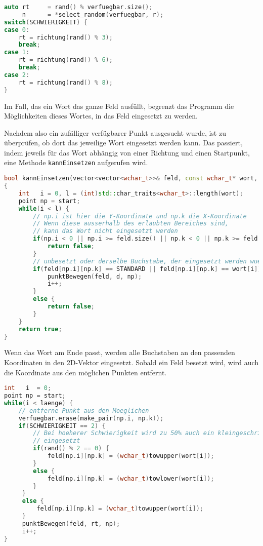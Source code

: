 \documentclass[a4paper,10pt,ngerman]{scrartcl}
\begin{document}
\begin{lstlisting}[language=C++]
auto rt     = rand() % verfuegbar.size();
     n      = *select_random(verfuegbar, r);
switch(SCHWIERIGKEIT) {
case 0:
    rt = richtung(rand() % 3);
    break;
case 1:
    rt = richtung(rand() % 6);
    break;
case 2:
    rt = richtung(rand() % 8);
}
\end{lstlisting}

Im Fall, das ein Wort das ganze Feld ausfüllt, begrenzt das Programm die Möglichkeiten dieses Wortes, in das Feld eingesetzt zu werden.

Nachdem also ein zufälliger verfügbarer Punkt ausgesucht wurde, ist zu überprüfen, ob dort das jeweilige Wort 
eingesetzt werden kann. Das passiert, indem jeweils für das Wort abhängig von einer Richtung und einen 
Startpunkt, eine Methode \lstinline{kannEinsetzen} aufgerufen wird.

\begin{lstlisting}[language=C++]
bool kannEinsetzen(vector<vector<wchar_t>>& feld, const wchar_t* wort, point start, richtung d)
{
    int   i = 0, l = (int)std::char_traits<wchar_t>::length(wort);
    point np = start;
    while(i < l) {
    	// np.i ist hier die Y-Koordinate und np.k die X-Koordinate
    	// Wenn diese ausserhalb des erlaubten Bereiches sind,
    	// kann das Wort nicht eingesetzt werden
        if(np.i < 0 || np.i >= feld.size() || np.k < 0 || np.k >= feld[0].size()) {
            return false;
        }
        // unbesetzt oder derselbe Buchstabe, der eingesetzt werden wuerde
        if(feld[np.i][np.k] == STANDARD || feld[np.i][np.k] == wort[i]) {
            punktBewegen(feld, d, np);
            i++;
        }
        else {
            return false;
        }
    }
    return true;
}
\end{lstlisting}
Wenn das Wort am Ende passt, werden alle Buchstaben an den passenden Koordinaten in den 2D-Vektor eingesetzt.
Sobald ein Feld besetzt wird, wird auch die Koordinate aus den möglichen Punkten entfernt.
\begin{lstlisting}[language=C++]
int   i  = 0;
point np = start;
while(i < laenge) {
	// entferne Punkt aus den Moeglichen
    verfuegbar.erase(make_pair(np.i, np.k));
    if(SCHWIERIGKEIT == 2) {
    	// Bei hoeherer Schwierigkeit wird zu 50% auch ein kleingeschriebener Buchstabe
    	// eingesetzt
        if(rand() % 2 == 0) {
            feld[np.i][np.k] = (wchar_t)towupper(wort[i]);
        }
        else {
            feld[np.i][np.k] = (wchar_t)towlower(wort[i]);
        }
     }
     else {
         feld[np.i][np.k] = (wchar_t)towupper(wort[i]);
     }
     punktBewegen(feld, rt, np);
     i++;
}
\end{lstlisting}
\end{document}
